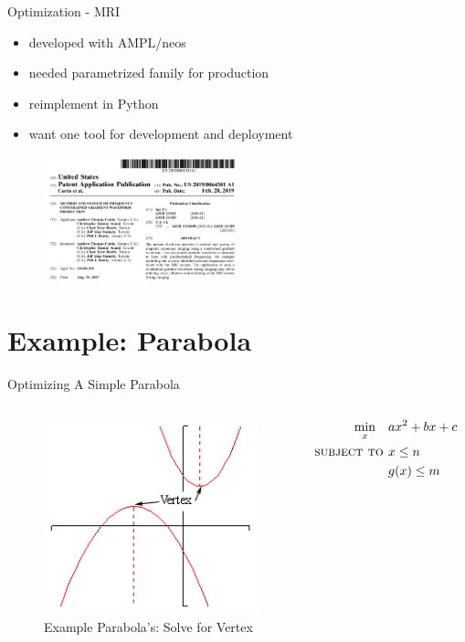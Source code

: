 \documentclass[presentation]{beamer}
\begin{document}
\begin{frame}[label={sec:orgd027c63}]{Optimization - MRI}
  \begin{itemize}
  \item developed with AMPL/neos
  \item needed parametrized family for production
  \item reimplement in Python
  \item want one tool for development and deployment
  \end{itemize}
\begin{figure}
\includegraphics[width=0.5\textwidth]{figs/GradPatent.png}
\end{figure}
\end{frame}


\section{Example:  Parabola}
\label{sec:org6765f95}
\begin{frame}[label={sec:org0a594b7}]{Optimizing A Simple Parabola}
  \begin{columns}
    \begin{column}{0.5\textwidth}
      \begin{figure}
       \includegraphics[scale=0.5]{figs/parabola.png}
       \caption{Example Parabola's: Solve for Vertex}
      \end{figure}
    \end{column}
    \begin{column}{0.4\textwidth}
      \begin{align}
        \min_x \quad & a x^2 + b x + c  \\
        \textsc{subject to } & x \leq n & \\
        & g(x) \leq m
      \end{align}
    \end{column}
  \end{columns}
\end{frame}
\end{document}
